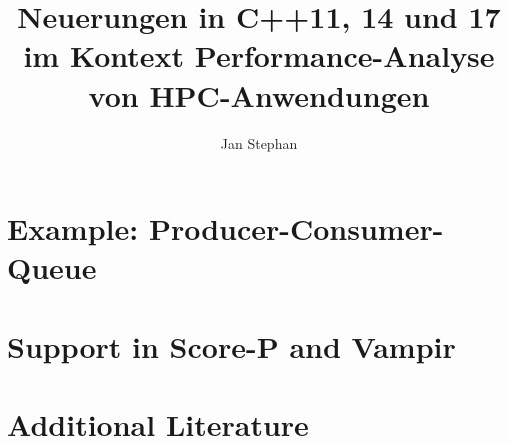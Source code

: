 \documentclass[utf8,hauptseminar]{zihpub}
\author{Jan Stephan}
\title{Neuerungen in C++11, 14 und 17 im Kontext Performance-Analyse von HPC-Anwendungen}
\begin{document}

 
\section{Example: Producer-Consumer-Queue}

\section{Support in Score-P and Vampir}

\section{Additional Literature}


{}
\end{document}

